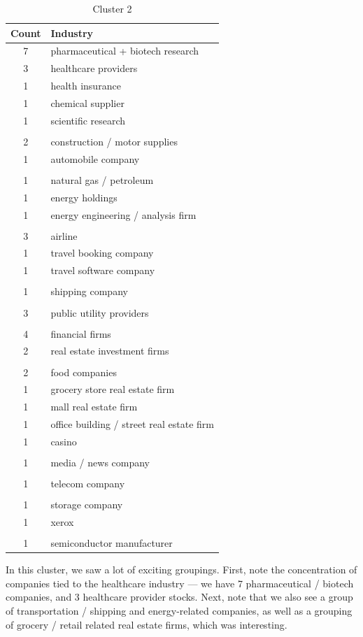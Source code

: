 \documentclass[final]{article}
\begin{document}
\begin{table}[H]
\centering
\caption{Cluster 2}
\label{c2}
\begin{tabular}{@{}cl@{}}
  \toprule
  Count & Industry  \\ \midrule
  7 & pharmaceutical + biotech research \\
  3 & healthcare providers \\
  1 & health insurance \\
  1 & chemical supplier \\
  1 & scientific research \\
        & \\
  2 & construction / motor supplies \\
  1 & automobile company \\
        & \\
  1 & natural gas / petroleum \\
  1 & energy holdings \\
  1 & energy engineering / analysis firm \\
        & \\
  3 & airline \\
  1 & travel booking company \\
  1 & travel software company \\
        & \\
  1 & shipping company \\
        & \\
  3 & public utility providers \\
        & \\
  4 & financial firms \\
  2 & real estate investment firms \\
        & \\
  2 & food companies \\
  1 & grocery store real estate firm \\
  1 & mall real estate firm \\
  1 & office building / street real estate firm \\
  1 & casino \\
        & \\
  1 & media / news company \\
        & \\
  1 & telecom company \\
        & \\
  1 & storage company \\
  1 & xerox \\
        & \\
  1 & semiconductor manufacturer\\
  \bottomrule
\end{tabular}
\end{table}
In this cluster, we saw a lot of exciting groupings. First, note the
concentration of companies tied to the healthcare industry --- we have
7 pharmaceutical / biotech companies, and 3 healthcare provider
stocks. Next, note that we also see a group of transportation /
shipping and energy-related companies, as well as a grouping of
grocery / retail related real estate firms, which was interesting.
\end{document}
